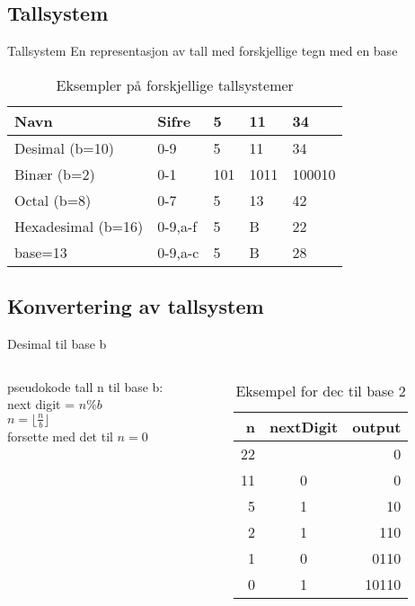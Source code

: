 \subsection*{Tallsystem}
\begin{frame}
\begin{block}{Tallsystem}
En representasjon av tall med forskjellige tegn med en base
\end{block}
\pause

\medskip

\begin{table}[]
\centering
\label{tab:tallsystemer}
\begin{tabular}{l|l|l|l|l}
Navn & Sifre & 5 & 11 & 34 \\ \hline
Desimal (b=10) & 0-9 & 5& 11 & 34 \\
Binær (b=2) & 0-1 & 101 & 1011 & 100010 \\
Octal (b=8) & 0-7 & 5&  13 & 42\\
Hexadesimal (b=16) & 0-9,a-f& 5& B& 22\\
base=13 & 0-9,a-c & 5& B& 28
\end{tabular}
\caption{Eksempler på forskjellige tallsystemer}
\end{table}
\end{frame}

\subsection*{Konvertering av tallsystem}
\begin{frame}[fragile]{Desimal til base b}
\begin{columns}
    \begin{column}{0.30\textwidth}
    \begin{block}{pseudokode}
            tall n til base b:\\
            next digit = $n\%b$\\
            $n=\lfloor\frac{n}{b}\rfloor$\\
            forsette med det til $n=0$
    \end{block}
    \end{column}
 	\pause
    \begin{column}{0.66\textwidth}
\begin{table}
\begin{tabular}{r|c|r}
n & nextDigit & output \\ \hline
22 & & 0 \\
11 & 0 & 0\\
5 & 1 & 10\\
2 & 1 & 110\\
1 & 0 & 0110\\
0 & 1 & 10110
\end{tabular}
\caption{Eksempel for dec til base 2}
\end{table}
 	\end{column}
 	\end{columns}
\end{frame}

